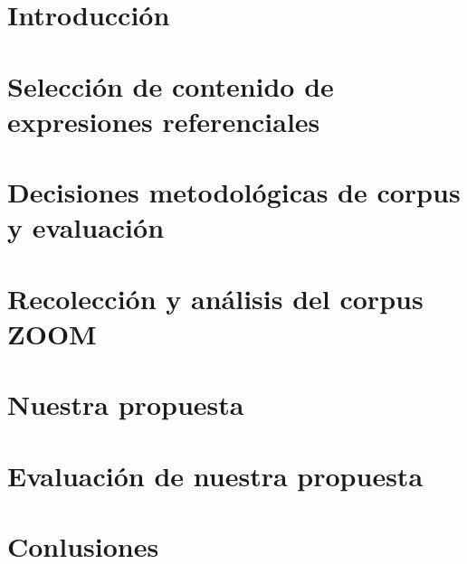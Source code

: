 %

\mainmatter %



\chapter{Introducci\'on}
\label{sec:intro}

\chapter{Selecci\'on de contenido de expresiones referenciales}
\label{sec:seleccion}


\chapter{Decisiones metodol\'ogicas de corpus y evaluaci\'on}
\label{sec:metodologia}


\chapter{Recolecci\'on y an\'alisis del corpus ZOOM}
\label{sec:corpus}


\chapter{Nuestra propuesta}
\label{sec:algoritmo}


\chapter{Evaluaci\'on de nuestra propuesta}
\label{sec:evaluacion}


\chapter{Conlusiones}
\label{sec:conclusiones}


\vskip 0.2in



